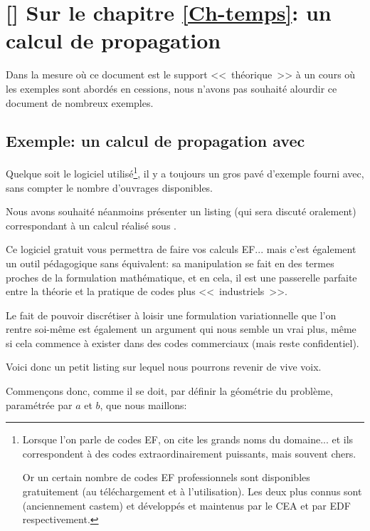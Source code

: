 \ifVersionAvecExemplesSepares
   \chapter{[\freefem] Sur le chapitre \ref{Ch-temps}: un calcul de propagation}

   Dans la mesure où ce document est le support <<~théorique~>> à un cours
   où les exemples sont abordés en cessions, nous n'avons pas souhaité alourdir
   ce document de nombreux exemples.
\else
   \section{Exemple: un calcul de propagation avec \freefem}
\fi


\medskip
Quelque soit le logiciel utilisé\footnote{%
Lorsque l'on parle de codes EF, on cite les grands noms du domaine... et ils correspondent à des
codes extraordinairement puissants, mais souvent chers.

Or un certain nombre de codes EF professionnels sont disponibles gratuitement (au téléchargement
et à l'utilisation).
Les deux plus connus sont \castem (anciennement castem) et \aster développés et maintenus
par le CEA et par EDF respectivement.%
}, il y a toujours un gros pavé d'exemple fourni avec,
sans compter le nombre d'ouvrages disponibles.

\medskip
Nous avons souhaité néanmoins présenter un listing (qui sera discuté oralement)
correspondant à un calcul réalisé sous \freefem.

Ce logiciel gratuit vous permettra de faire vos calculs EF... mais c'est également un outil 
pédagogique sans équivalent: sa manipulation se fait en des termes proches de la
formulation mathématique, et en cela, il est une passerelle parfaite entre la théorie
et la pratique de codes plus <<~industriels~>>.

Le fait de pouvoir discrétiser à loisir une formulation variationnelle que l'on rentre
soi-même est également un argument qui nous semble un vrai plus, même si
cela commence à exister dans des codes commerciaux (mais reste confidentiel).

\medskip
Voici donc un petit listing sur lequel nous pourrons revenir de vive voix.

Commençons donc, comme il se doit, par définir la géométrie du problème, paramétrée
par $a$ et $b$, que nous maillons:

